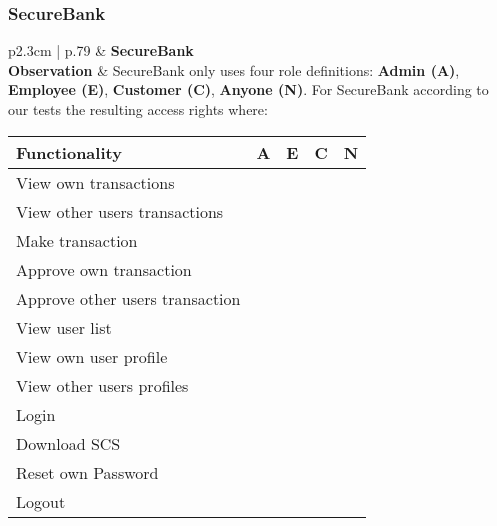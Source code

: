 \subsubsection{SecureBank}
\begin{longtable}[l]{p{2.3cm} | p{.79\linewidth}}
    \hline
    & \textbf{SecureBank} \\ 
    \hline
    \textbf{Observation} &
        SecureBank only uses four role definitions: \textbf{Admin (A)}, \textbf{Employee (E)}, \textbf{Customer (C)}, \textbf{Anyone (N)}.
        For SecureBank according to our tests the resulting access rights where:
        \begin{center}
            \begin{tabular}{ | l | l | l | l | l |}
            \hline
            \textbf{Functionality}          & \textbf{A} & \textbf{E} & \textbf{C} & \textbf{N} \\ \hline
            View own transactions           & \xmark    & \xmark    & \cmark    & \xmark \\ \hline
            View other users transactions   & \cmark    & \cmark    & \xmark    & \xmark \\ \hline
            Make transaction                & \xmark    & \xmark    & \cmark    & \xmark \\ \hline
            Approve own transaction         & \xmark    & \xmark    & \xmark    & \xmark \\ \hline
            Approve other users transaction & \cmark    & \cmark    & \xmark    & \xmark \\ \hline
            View user list                  & \cmark    & \cmark    & \xmark    & \xmark \\ \hline
            View own user profile           & \cmark    & \cmark    & \cmark    & \xmark \\ \hline
            View other users profiles       & \cmark    & \cmark    & \xmark    & \xmark \\ \hline
            Login                           & \cmark    & \cmark    & \cmark    & \xmark \\ \hline
            Download SCS                    & \cmark    & \cmark    & \cmark    & \xmark \\ \hline
            Reset own Password              & \cmark    & \cmark    & \cmark    & \xmark \\ \hline
            Logout                          & \cmark    & \cmark    & \cmark    & \xmark \\ \hline

\end{tabular}
\end{center}
\end{longtable}
